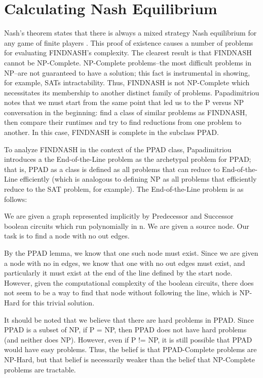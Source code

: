 \documentclass[10pt]{article}
\theoremstyle{definition}
\theoremstyle{remark}
\theoremstyle{definition}
\begin{document}
\section{Calculating Nash Equilibrium}
    Nash's theorem states that there is always a mixed strategy Nash equilibrium for any game of finite players \cite{nash1951noncooperative}. This proof of existence causes a number of problems for evaluating FINDNASH's complexity. The clearest result is that FINDNASH cannot be NP-Complete. NP-Complete problems--the most difficult problems in NP--are not guaranteed to have a solution; this fact is instrumental in showing, for example, SATs intractability. Thus, FINDNASH is not NP-Complete which necessitates its membership to another distinct family of problems. Papadimitriou notes that we must start from the same point that led us to the P versus NP conversation in the beginning: find a class of similar problems as FINDNASH, then compare their runtimes and try to find reductions from one problem to another. In this case, FINDNASH is complete in the subclass PPAD. 

To analyze FINDNASH in the context of the PPAD class, Papadimitriou introduces a the End-of-the-Line problem as the archetypal problem for PPAD; that is, PPAD as a class is defined as all problems that can reduce to End-of-the-Line efficiently (which is analogous to defining NP as all problems that efficiently reduce to the SAT problem, for example). The End-of-the-Line problem is as follows: 

We are given a graph represented implicitly by Predecessor and Successor boolean circuits which run polynomially in n. We are given a source node. Our task is to find a node with no out edges.

By the PPAD lemma, we know that one such node must exist. Since we are given a node with no in edges, we know that one with no out edges must exist, and particularly it must exist at the end of the line defined by the start node. However, given the computational complexity of the boolean circuits, there does not seem to be a way to find that node without following the line, which is NP-Hard for this trivial solution.

It should be noted that we believe that there are hard problems in PPAD. Since PPAD is a subset of NP, if P = NP, then PPAD does not have hard problems (and neither does NP). However, even if P != NP, it is still possible that PPAD would have easy problems. Thus, the belief is that PPAD-Complete problems are NP-Hard, but that belief is necessarily weaker than the belief that NP-Complete problems are tractable. 
\end{document}
